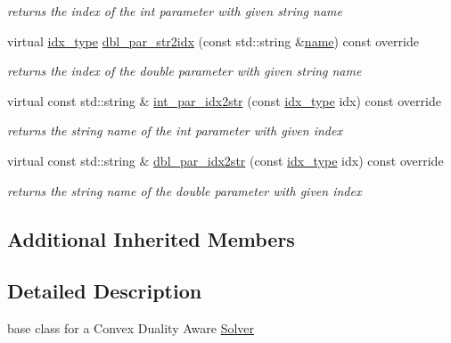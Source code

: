 \begin{Indent}
\begin{DoxyCompactItemize}
\begin{DoxyCompactList}\small\item\em returns the index of the int parameter with given string name \end{DoxyCompactList}\item 
virtual \mbox{\hyperlink{class_s_m_spp__di__unipi__it_1_1_thin_compute_interface_aa3d710629ad8c434286726ad810c3b47}{idx\+\_\+type}} \mbox{\hyperlink{class_s_m_spp__di__unipi__it_1_1_c_d_a_solver_a6d353ac3d1200d9bea89235da61bc4f3}{dbl\+\_\+par\+\_\+str2idx}} (const std\+::string \&\mbox{\hyperlink{class_s_m_spp__di__unipi__it_1_1_solver_a81dba299d9c4ccc6c1e6be0a845142fd}{name}}) const override
\begin{DoxyCompactList}\small\item\em returns the index of the double parameter with given string name \end{DoxyCompactList}\item 
virtual const std\+::string \& \mbox{\hyperlink{class_s_m_spp__di__unipi__it_1_1_c_d_a_solver_a61e973f39747f63b8f56d97cc62e32ce}{int\+\_\+par\+\_\+idx2str}} (const \mbox{\hyperlink{class_s_m_spp__di__unipi__it_1_1_thin_compute_interface_aa3d710629ad8c434286726ad810c3b47}{idx\+\_\+type}} idx) const override
\begin{DoxyCompactList}\small\item\em returns the string name of the int parameter with given index \end{DoxyCompactList}\item 
virtual const std\+::string \& \mbox{\hyperlink{class_s_m_spp__di__unipi__it_1_1_c_d_a_solver_a93f1297e7910e91cc18b303376191026}{dbl\+\_\+par\+\_\+idx2str}} (const \mbox{\hyperlink{class_s_m_spp__di__unipi__it_1_1_thin_compute_interface_aa3d710629ad8c434286726ad810c3b47}{idx\+\_\+type}} idx) const override
\begin{DoxyCompactList}\small\item\em returns the string name of the double parameter with given index \end{DoxyCompactList}\end{DoxyCompactItemize}
\end{Indent}
\subsection*{Additional Inherited Members}


\subsection{Detailed Description}
base class for a Convex Duality Aware \mbox{\hyperlink{class_s_m_spp__di__unipi__it_1_1_solver}{Solver}} 

